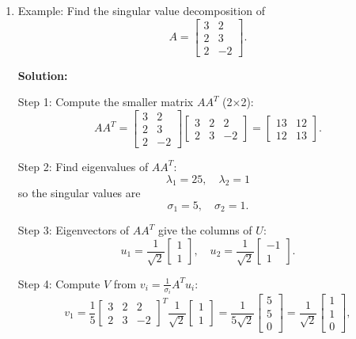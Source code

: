 \documentclass{article}
\begin{document}
\begin{enumerate}
\item Example: Find the singular value decomposition of
\[
A =
\begin{bmatrix}
3 & 2 \\
2 & 3 \\
2 & -2
\end{bmatrix}.
\]

\textbf{Solution:}

Step 1: Compute the smaller matrix $AA^T$ (2×2):
\[
AA^T = 
\begin{bmatrix}
3 & 2 \\
2 & 3 \\
2 & -2
\end{bmatrix}
\begin{bmatrix}
3 & 2 & 2 \\
2 & 3 & -2
\end{bmatrix}
=
\begin{bmatrix}
13 & 12 \\
12 & 13
\end{bmatrix}.
\]

Step 2: Find eigenvalues of $AA^T$:
\[
\lambda_1 = 25, \quad \lambda_2 = 1
\]
so the singular values are
\[
\sigma_1 = 5, \quad \sigma_2 = 1.
\]

Step 3: Eigenvectors of $AA^T$ give the columns of $U$:
\[
u_1 = \frac{1}{\sqrt{2}}
\begin{bmatrix}1\\1\end{bmatrix}, \quad
u_2 = \frac{1}{\sqrt{2}}
\begin{bmatrix}-1\\1\end{bmatrix}.
\]

Step 4: Compute $V$ from $v_i = \frac{1}{\sigma_i} A^T u_i$:
\[
v_1 = \frac{1}{5}
\begin{bmatrix}
3 & 2 & 2\\
2 & 3 & -2
\end{bmatrix}^T
\frac{1}{\sqrt{2}}
\begin{bmatrix}1\\1\end{bmatrix}
=
\frac{1}{5\sqrt{2}}
\begin{bmatrix}5\\5\\0\end{bmatrix}
=
\frac{1}{\sqrt{2}}
\begin{bmatrix}1\\1\\0\end{bmatrix},
\]


\end{enumerate}
\end{document}
